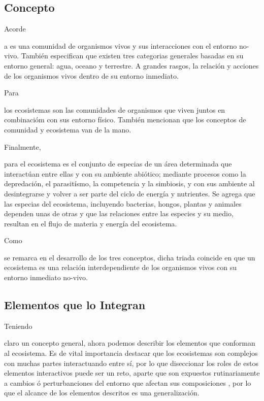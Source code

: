 \documentclass[stu, 12pt, letterpaper, donotrepeattitle, floatsintext, natbib]{apa7}
\begin{document}
\subsection{Concepto}
Acorde \begin{justifying}
    a \cite{rintoul-no-date}
      es una comunidad de organismos vivos y sus interacciones con el entorno no-vivo. También especifican que existen tres categorias generales basadas en su entorno general:
      agua, oceano y terrestre. A grandes rasgos, la relación y acciones de los organismos vivos dentro de su entorno inmediato.\par
\end{justifying}
Para \begin{justifying}
    \cite{khan-academy-no-date}
    los ecosistemas son las comunidades de organismos que viven juntos en combinacióm con sus entorno físico. También mencionan que los conceptos de comunidad y ecosistema van de la mano.\par
\end{justifying}
Finalmente, \begin{justifying}
    para \cite{conabio-no-date}
    el ecosistema es el conjunto de especias de un área determinada que interactúan entre ellas y con su ambiente abiótico; mediante procesos como la depredación, el parasitísmo, la competencia
    y la simbiosis, y con sus ambiente al desintegrarse y volver a ser parte del ciclo de energía y nutrientes. Se agrega que las especias del ecosistema, incluyendo bacterias, hongos, plantas y animales
    dependen unas de otras y que las relaciones entre las especies y su medio, resultan en el flujo de materia y energía del ecosistema.\par
\end{justifying}
Como \begin{justifying}
    se remarca en el desarrollo de los tres conceptos, dicha triada coincide en que un ecosistema es una relación interdependiente de los organismos vivos con su entorno inmediato no-vivo.\par
\end{justifying}
\vspace{\baselineskip}
\subsection{Elementos que lo Integran}
Teniendo \begin{justifying}
claro un concepto general, ahora podemos describir los elementos que conforman al ecosistema. Es de vital importancia destacar que los ecosistemas son complejos \citep{maayan-2017} con muchas partes interactuando entre sí, por lo que
diseccionar los roles de estos elementos interactivos puede ser un reto, aparte que son expuestos rutinariamente a cambios ó perturbanciones del entorno que afectan sus composiciones \citep{rintoul-no-date}, por lo que el alcance de los elementos descritos
es una generalización.\par
\end{justifying}
\vspace{\baselineskip}
\end{document}
